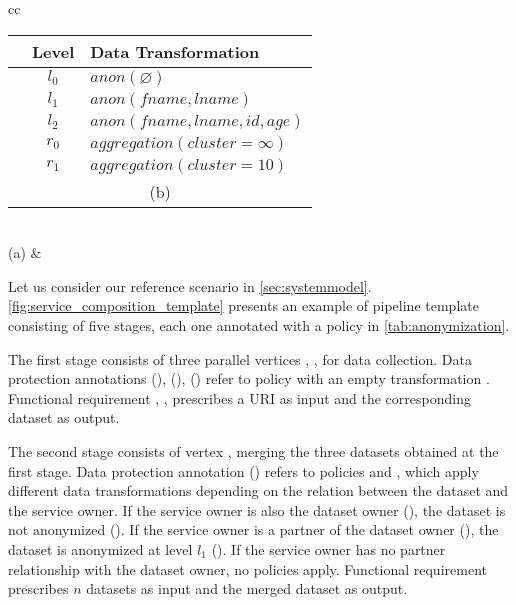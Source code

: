 \begin{table*}[ht!]
{\begin{tabular}[t]{cc}
      \begin{tabular}[t]{c|c|l}
        \textbf{\tp{i}} & \textbf{Level} & \textbf{Data Transformation}                      \\\hline
        \tp{0}          & $l_0$          & $anon(\varnothing)$                               \\
        \tp{1}          & $l_1$          & $anon(fname, lname)$                              \\
        \tp{2}          & $l_2$          & $anon(fname, lname, id, age)$                     \\
        \tp{3}          & $r_0$          & $aggregation(cluster=\infty)                    $ \\
        \tp{4}          & $r_1$          & $aggregation(cluster=10)                       $  \\
        \multicolumn{3}{c}{\footnotesize (b)}
      \end{tabular} \\
      \footnotesize (a) &                                                                                          \\
    \end{tabular}
  }
\end{table*}
Let us consider our reference scenario in \cref{sec:systemmodel}.
\cref{fig:service_composition_template} presents an example of pipeline template consisting of five stages, each one annotated with a policy in \cref{tab:anonymization}.

The first stage consists of three parallel vertices , ,  for data collection.
Data protection annotations \myLambda(), \myLambda(), \myLambda() refer to policy  with an empty transformation .
Functional requirement , ,   prescribes a URI as input and the corresponding dataset as output.

The second stage consists of vertex , merging the three datasets obtained at the first stage. Data protection annotation \myLambda() refers to policies  and , which apply different data transformations depending on the relation between the dataset and the service owner.
If the service owner is also the dataset owner (\pone), the dataset is not anonymized (). If the service owner is a partner of the dataset owner (\ptwo), the dataset is anonymized at level $l_1$ (). If the service owner has no partner relationship with the dataset owner, no policies apply.
Functional requirement  prescribes $n$ datasets as input and the merged dataset as output.

